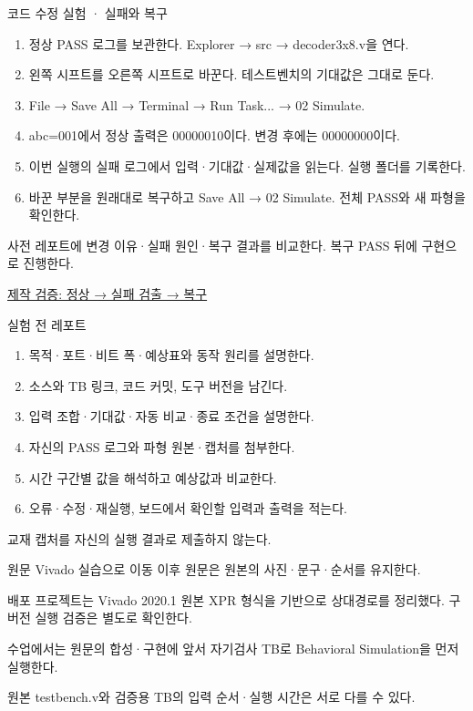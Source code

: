\begin{frame}{코드 수정 실험 · 실패와 복구}\relax
\small
\begin{enumerate}\setlength{\itemsep}{0.22cm}
\item 정상 PASS 로그를 보관한다. Explorer → src → decoder3x8.v을 연다.
\item 왼쪽 시프트를 오른쪽 시프트로 바꾼다. 테스트벤치의 기대값은 그대로 둔다.
\item File → Save All → Terminal → Run Task... → 02 Simulate.
\item abc=001에서 정상 출력은 00000010이다. 변경 후에는 00000000이다.
\item 이번 실행의 실패 로그에서 입력·기대값·실제값을 읽는다. 실행 폴더를 기록한다.
\item 바꾼 부분을 원래대로 복구하고 Save All → 02 Simulate. 전체 PASS와 새 파형을 확인한다.
\end{enumerate}
사전 레포트에 변경 이유·실패 원인·복구 결과를 비교한다. 복구 PASS 뒤에 구현으로 진행한다.\par\href{https://github.com/Glaysia/ece2_26_2_2/blob/daily/0910/example/fpga_projects_hdl/LAB1/docs/student-modification-validation.json}{제작 검증: 정상 → 실패 검출 → 복구}
\end{frame}

\begin{frame}{실험 전 레포트}\relax
\small
\begin{enumerate}\setlength{\itemsep}{0.22cm}
\item 목적·포트·비트 폭·예상표와 동작 원리를 설명한다.
\item 소스와 TB 링크, 코드 커밋, 도구 버전을 남긴다.
\item 입력 조합·기대값·자동 비교·종료 조건을 설명한다.
\item 자신의 PASS 로그와 파형 원본·캡처를 첨부한다.
\item 시간 구간별 값을 해석하고 예상값과 비교한다.
\item 오류·수정·재실행, 보드에서 확인할 입력과 출력을 적는다.
\end{enumerate}
교재 캡처를 자신의 실행 결과로 제출하지 않는다.\par
\end{frame}

\begin{frame}[label=legacy-09-vivado]{원문 Vivado 실습으로 이동}\relax
\small
이후 원문은 원본의 사진·문구·순서를 유지한다.\par\vspace{0.22cm}배포 프로젝트는 Vivado 2020.1 원본 XPR 형식을 기반으로 상대경로를 정리했다. 구버전 실행 검증은 별도로 확인한다.\par\vspace{0.22cm}수업에서는 원문의 합성·구현에 앞서 자기검사 TB로 Behavioral Simulation을 먼저 실행한다.\par\vspace{0.22cm}원본 testbench.v와 검증용 TB의 입력 순서·실행 시간은 서로 다를 수 있다.\par
\end{frame}


